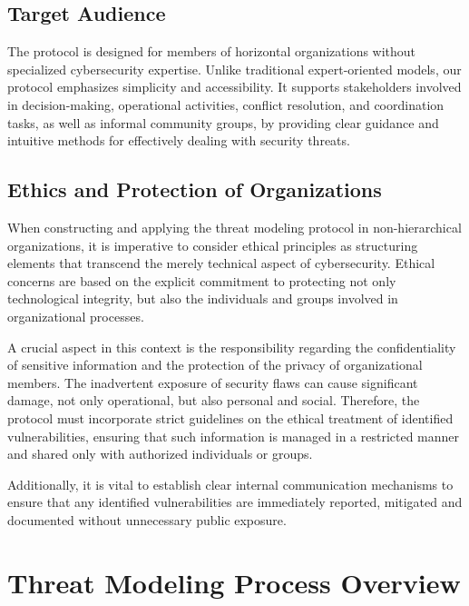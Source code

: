 \subsection{Target Audience}
\label{subsec:target_audience}

The protocol is designed for members of horizontal organizations without
specialized cybersecurity expertise. Unlike traditional expert-oriented models,
our protocol emphasizes simplicity and accessibility. It supports stakeholders
involved in decision-making, operational activities, conflict resolution, and
coordination tasks, as well as informal community groups, by providing clear
guidance and intuitive methods for effectively dealing with security threats.

\subsection{Ethics and Protection of Organizations}
\label{subsec:ethics_protection}

When constructing and applying the threat modeling protocol in non-hierarchical
organizations, it is imperative to consider ethical principles as structuring
elements that transcend the merely technical aspect of cybersecurity. Ethical
concerns are based on the explicit commitment to protecting not only
technological integrity, but also the individuals and groups involved in
organizational processes.

A crucial aspect in this context is the responsibility regarding the
confidentiality of sensitive information and the protection of the privacy of
organizational members. The inadvertent exposure of security flaws can cause
significant damage, not only operational, but also personal and social.
Therefore, the protocol must incorporate strict guidelines on the ethical
treatment of identified vulnerabilities, ensuring that such information is
managed in a restricted manner and shared only with authorized individuals or
groups.

Additionally, it is vital to establish clear internal communication mechanisms
to ensure that any identified vulnerabilities are immediately reported,
mitigated and documented without unnecessary public exposure.

\section{Threat Modeling Process Overview}
\label{sec:threat_modeling_process_overview}

